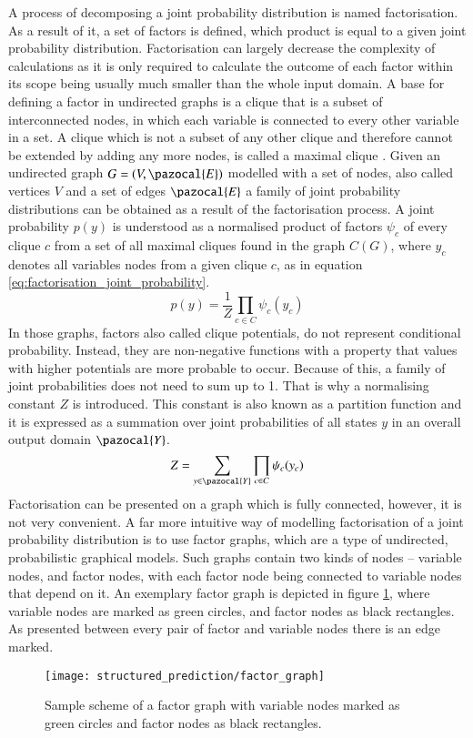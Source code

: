 A process of decomposing a joint probability distribution is named factorisation. As a result of it, a set of factors is defined, which product is equal to a given joint probability distribution. Factorisation can largely decrease the complexity of calculations as it is only required to calculate the outcome of each factor within its scope being usually much smaller than the whole input domain. A base for defining a factor in undirected graphs is a clique that is a subset of interconnected nodes, in which each variable is connected to every other variable in a set. A clique which is not a subset of any other clique and therefore cannot be extended by adding any more nodes, is called a maximal clique \cite{clique}. Given an undirected graph $G=(V,\pazocal{E})$ modelled with a set of nodes, also called vertices $V$ and a set of edges $\pazocal{E}$ a family of joint probability distributions can be obtained as a result of the factorisation process. A joint probability $p(y)$ is understood as a normalised product of factors $\psi_{c}$ of every clique $c$ from a set of all maximal cliques found in the graph $C(G)$, where $y_c$ denotes all variables nodes from a given clique $c$, as in equation \ref{eq:factorisation_joint_probability}.
\begin{equation}
    \label{eq:factorisation_joint_probability}
    p(y)=\frac{1}{Z}\prod_{c\in C}\psi_{c}({y_c})
\end{equation}
In those graphs, factors also called clique potentials, do not represent conditional probability. Instead, they are non-negative functions with a property that values with higher potentials are more probable to occur. Because of this, a family of joint probabilities does not need to sum up to 1. That is why a normalising constant $Z$ is introduced. This constant is also known as a partition function and it is expressed as a summation over joint probabilities of all states $y$ in an overall output domain $\pazocal{Y}$.
\begin{equation}
    Z=\sum_{y\in \pazocal{Y}}\prod_{c\in C}\psi_{c}({y_c}) 
\end{equation}
Factorisation can be presented on a graph which is fully connected, however, it is not very convenient. A far more intuitive way of modelling factorisation of a joint probability distribution is to use factor graphs, which are a type of undirected, probabilistic graphical models. Such graphs contain two kinds of nodes – variable nodes, and factor nodes, with each factor node being connected to variable nodes that depend on it. An exemplary factor graph is depicted in figure \ref{fig:factor_graph}, where variable nodes are marked as green circles, and factor nodes as black rectangles. As presented between every pair of factor and variable nodes there is an edge marked.
\begin{figure}[ht]
    \centering
    \texttt{[image: structured\_prediction/factor\_graph]}
    \caption[Sample scheme of a factor graph.]{Sample scheme of a factor graph with variable nodes marked as green circles and factor nodes as black rectangles.}
     \label{fig:factor_graph}
\end{figure}

